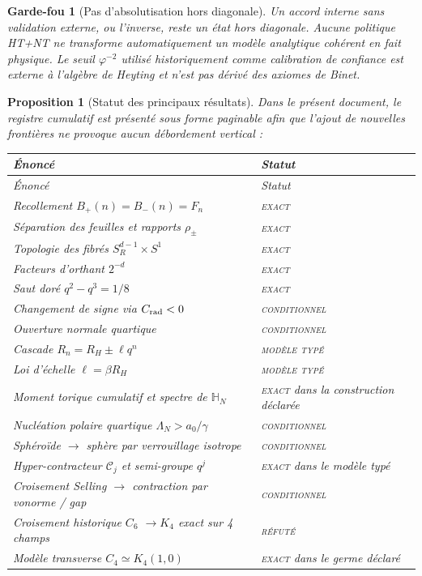 \documentclass[11pt,a4paper]{article}
\newtheorem{proposition}[theorem]{Proposition}
\newtheorem{guardrail}[theorem]{Garde-fou}
\newcommand{\ph}{\varphi}
\newcommand{\statusExact}{\textsc{exact}}
\newcommand{\statusCond}{\textsc{conditionnel}}
\newcommand{\statusTyped}{\textsc{modèle typé}}
\begin{document}
\begin{guardrail}[Pas d'absolutisation hors diagonale]
Un accord interne sans validation externe, ou l'inverse, reste un état hors diagonale. Aucune politique HT+NT ne transforme automatiquement un modèle analytique cohérent en fait physique. Le seuil $\ph^{-2}$ utilisé historiquement comme calibration de confiance est externe à l'algèbre de Heyting et n'est pas dérivé des axiomes de Binet.
\end{guardrail}

\begin{proposition}[Statut des principaux résultats]
Dans le présent document, le registre cumulatif est présenté sous forme paginable afin que l'ajout de nouvelles frontières ne provoque aucun débordement vertical :
\begin{longtable}{@{}p{}p{}@{}}
\toprule
Énoncé & Statut\\
\midrule
\endfirsthead
\toprule
Énoncé & Statut\\
\midrule
\endhead
Recollement $B_+(n)=B_-(n)=F_n$ & \statusExact\\
Séparation des feuilles et rapports $\rho_\pm$ & \statusExact\\
Topologie des fibrés $S_R^{d-1}\times S^1$ & \statusExact\\
Facteurs d'orthant $2^{-d}$ & \statusExact\\
Saut doré $q^2-q^3=1/8$ & \statusExact\\
Changement de signe via $C_{\rm rad}<0$ & \statusCond\\
Ouverture normale quartique & \statusCond\\
Cascade $R_n=R_H\pm\ell q^n$ & \statusTyped\\
Loi d'échelle $\ell=\beta R_H$ & \statusTyped\\
Moment torique cumulatif et spectre de $\mathbb H_N$ & \statusExact{} dans la construction déclarée\\
Nucléation polaire quartique $\Lambda_N>a_0/\gamma$ & \statusCond\\
Sphéroïde $\to$ sphère par verrouillage isotrope & \statusCond\\
Hyper-contracteur $\mathcal C_j$ et semi-groupe $q^j$ & \statusExact{} dans le modèle typé\\
Croisement Selling $\to$ contraction par vonorme / gap & \statusCond\\
Croisement historique $C_6$ $\to K_4$ exact sur 4 champs & \textsc{réfuté}\\
Modèle transverse $C_4\simeq K_4(1,0)$ & \statusExact{} dans le germe déclaré\\

\end{longtable}
\end{proposition}
\end{document}
